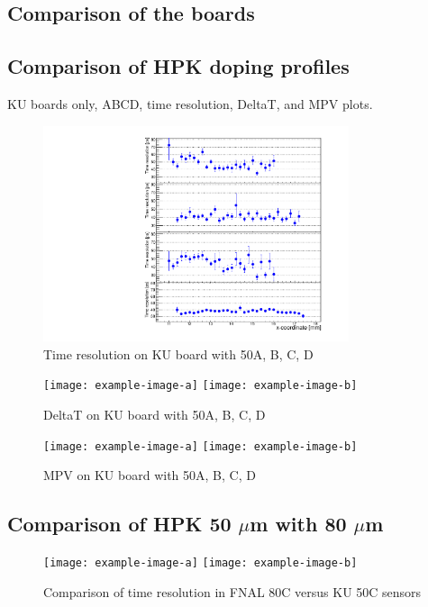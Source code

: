 \documentclass[preprint,1p]{elsarticle}
\begin{document}
\subsection{Comparison of the boards}


\subsection{Comparison of HPK doping profiles}

KU boards only, ABCD, time resolution, DeltaT, and MPV plots. 

\begin{figure}[htbp] 
\centering
\includegraphics[width=0.8\textwidth]{figs/KUBoard_HPK50ABCD/KUBoard_50ABCD_TimeResolution.pdf} 
\caption{Time resolution on KU board with 50A, B, C, D } 
\label{fig:Sensors} 
\end{figure} 

\begin{figure}[htbp] 
\centering
\texttt{[image: example-image-a]} 
\texttt{[image: example-image-b]} 
\caption{DeltaT on KU board with 50A, B, C, D } 
\label{fig:Sensors} 
\end{figure} 

\begin{figure}[htbp] 
\centering
\texttt{[image: example-image-a]} 
\texttt{[image: example-image-b]} 
\caption{MPV on KU board with 50A, B, C, D } 
\label{fig:Sensors} 
\end{figure} 



\subsection{Comparison of HPK 50 $\mu$m with 80 $\mu$m}

\begin{figure}[htbp] 
\centering
\texttt{[image: example-image-a]} 
\texttt{[image: example-image-b]} 
\caption{Comparison of time resolution in FNAL 80C versus KU 50C sensors } 
\label{fig:Sensors} 
\end{figure} 
\end{document}
